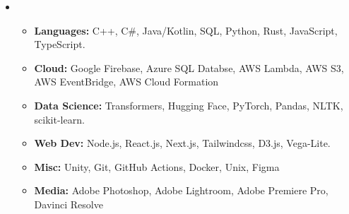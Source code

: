 \documentclass[letterpaper,10pt]{article}
\newcommand{\resumeItem}[1]{
  \item\small{
    {#1 \vspace{-3pt}}
  }
}
\newcommand{\resumeItemListStart}{\begin{itemize}}
\newcommand{\resumeItemListEnd}{\end{itemize}\vspace{-5pt}}
\begin{document}
    \begin{itemize}[leftmargin=0in, label={}]
        \item {
          \resumeItemListStart
            \resumeItem{\textbf{Languages:} C++, C\#, Java/Kotlin, SQL, Python, Rust, JavaScript, TypeScript.}
            \resumeItem{\textbf{Cloud:} Google Firebase, Azure SQL Databse, AWS Lambda, AWS S3, AWS EventBridge, AWS Cloud Formation}
            \resumeItem{\textbf{Data Science:} Transformers, Hugging Face, PyTorch, Pandas, NLTK, scikit-learn.}
            \resumeItem{\textbf{Web Dev:} Node.js, React.js, Next.js, Tailwindcss, D3.js, Vega-Lite.} 
            \resumeItem{\textbf{Misc:} Unity, Git, GitHub Actions, Docker, Unix, Figma}
            \resumeItem{\textbf{Media:} Adobe Photoshop, Adobe Lightroom, Adobe Premiere Pro, Davinci Resolve}
          \resumeItemListEnd
        }
    \end{itemize}
  
\end{document}

